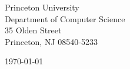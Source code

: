 \begin{minipage}{0.49\textwidth}
\begin{flushleft}
\noindent
Princeton University\\
Department of Computer Science\\
35 Olden Street\\
Princeton, NJ 08540-5233
\end{flushleft}
\end{minipage}
\begin{minipage}{0.47\textwidth}
\begin{flushright}
\today
\end{flushright}
\end{minipage} \\

\newcommand{\univ}{Princeton University}
\newcommand{\univshort}{Princeton}
\newcommand{\degree}{Ph.D.}
\newcommand{\dept}{Computer Science}
